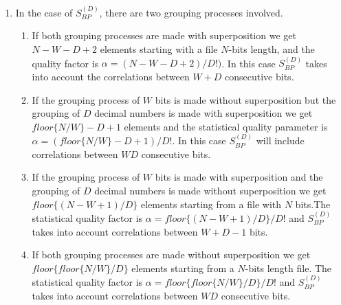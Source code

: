 \begin{enumerate}
	\item In the case of $S^{(D)}_{BP}$, there are two grouping processes involved. 
	\begin{enumerate}
		\item If both grouping processes are made with superposition we get $N-W-D+2$ elements starting with a file $N$-bits length, and the quality factor is $\alpha=(N-W-D+2)/D!)$. In this case $S^{(D)}_{BP}$ takes into account the correlations between $W+D$ consecutive bits. 
		\item If the grouping process of $W$ bits is made without superposition but the grouping of $D$ decimal numbers is made with superposition we get $floor\{N/W\}-D+1$ elements and the statistical quality parameter is $\alpha=(floor\{N/W\}-D+1)/D!$. In this case $S^{(D)}_{BP}$ will include correlations between $WD$ consecutive bits. 
		\item If the grouping process of $W$ bits is made with superposition and the grouping of $D$ decimal numbers is made without superposition we get $floor\{(N-W+1)/D\}$ elements starting from a file with $N$ bits.The statistical quality factor is $\alpha=floor\{(N-W+1)/D\}/D!$ and $S^{(D)}_{BP}$ takes into account correlations between $W+D-1$ bits.
		\item If both grouping processes are made without superposition we get $floor\{floor\{N/W\}/D\}$ elements starting from a $N$-bits length file. The statistical quality factor is $\alpha=floor\{floor\{N/W\}/D\}/D!$ and $S^{(D)}_{BP}$ takes into account correlations between $WD$ consecutive bits.
	\end{enumerate}
\end{enumerate} 